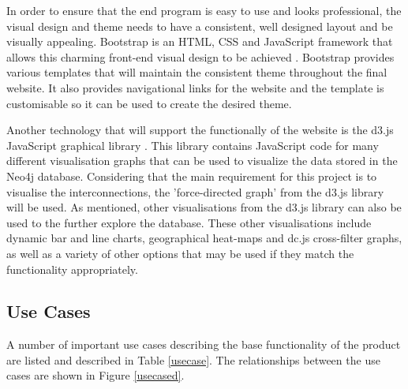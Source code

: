 \documentclass[12pt,onecolumn]{article}
\begin{document}
	In order to ensure that the end program is easy to use and looks professional, the visual design and theme needs to have a consistent, well designed layout and be visually appealing. Bootstrap is an HTML, CSS and JavaScript framework that allows this charming front-end visual design to be achieved \cite{Bootstrap}. Bootstrap provides various templates that will maintain the consistent theme throughout the final website. It also provides navigational links for the website and the template is customisable so it can be used to create the desired theme.
	
	Another technology that will support the functionally of the website is the d3.js JavaScript graphical library \cite{D3}. This library contains JavaScript code for many different visualisation graphs that can be used to visualize the data stored in the Neo4j database. Considering that the main requirement for this project is to visualise the interconnections, the 'force-directed graph' from the d3.js library will be used. As mentioned, other visualisations from the d3.js library can also be used to the further explore the database. These other visualisations include dynamic bar and line charts, geographical heat-maps and dc.js cross-filter graphs, as well as a variety of other options that may be used if they match the functionality appropriately.
	
	\subsection{Use Cases}
	A number of important use cases describing the base functionality of the product are listed and described in Table \ref{usecase}. The relationships between the use cases are shown in Figure \ref{usecased}.
	
\end{document}
